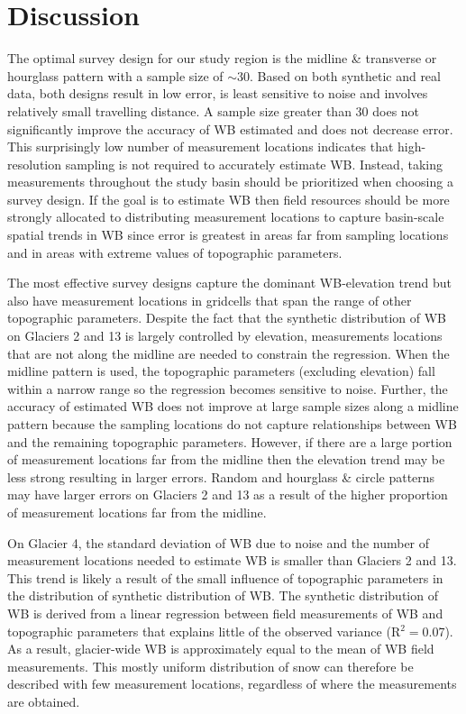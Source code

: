 \documentclass[twocolumn,letterpaper]{igs}
\begin{document}
\section{Discussion}

The optimal survey design for our study region is the midline \& transverse or  hourglass pattern with a sample size of $\sim30$. Based on both synthetic and real data, both designs result in low error, is least sensitive to noise and involves relatively small travelling distance. A sample size greater than 30 does not significantly improve the accuracy of WB estimated and does not decrease error. This surprisingly low number of measurement locations indicates that high-resolution sampling is not required to accurately estimate WB. Instead, taking measurements throughout the study basin should be prioritized when choosing a survey design. If the goal is to estimate WB then field resources should be more strongly allocated to distributing measurement locations to capture basin-scale spatial trends in WB since error is greatest in areas far from sampling locations and in areas with extreme values of topographic parameters. 

The most effective survey designs capture the dominant WB-elevation trend but also have measurement locations in gridcells that span the range of other topographic parameters. Despite the fact that the synthetic distribution of WB on Glaciers 2 and 13 is largely controlled by elevation, measurements locations that are not along the midline are needed to constrain the regression. When the midline pattern is used, the topographic parameters (excluding elevation) fall within a narrow range so the regression becomes sensitive to noise. Further, the accuracy of estimated WB does not improve at large sample sizes along a midline pattern because the sampling locations do not capture relationships between WB and the remaining topographic parameters. However, if there are a large portion of measurement locations far from the midline then the elevation trend may be less strong resulting in larger errors. Random and hourglass \& circle patterns may have larger errors on Glaciers 2 and 13 as a result of the higher proportion of measurement locations far from the midline. 

On Glacier 4, the standard deviation of WB due to noise and the number of measurement locations needed to estimate WB is smaller than Glaciers 2 and 13. This trend is likely a result of the small influence of topographic parameters in the distribution of synthetic distribution of WB. The synthetic distribution of WB is derived from a linear regression between field measurements of WB and topographic parameters that explains little of the observed variance (R$^2=$0.07). As a result, glacier-wide WB is approximately equal to the mean of WB field measurements. This mostly uniform distribution of snow can therefore be described with few measurement locations, regardless of where the measurements are obtained. 
\end{document}
